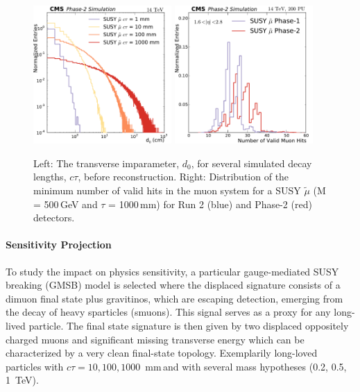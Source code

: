 \begin{figure}[hbtp]\begin{center}
\includegraphics[width=0.47\textwidth]{figures/Stage0h1_0_d0_smuon_daughter}
\includegraphics[width=0.47\textwidth]{figures/MuonHitsEndcap}
\caption{
Left: The transverse imparameter, $d_{0}$, for several simulated decay lengths, $c\tau$, before reconstruction.
Right: Distribution of the minimum number of valid hits in the muon system for a SUSY $\widetilde{\mu}$ (M = 500\,GeV and $\tau$ = 1000\,mm) for Run 2 (blue) and Phase-2 (red) detectors. 
}
\label{fig:perfDisplaced}
\end{center}
\end{figure}

\paragraph{Sensitivity Projection}

To study the impact on physics sensitivity, a particular gauge-mediated SUSY breaking (GMSB) model is selected where
the displaced signature consists of a dimuon final state plus gravitinos, which are escaping detection, emerging from the decay of heavy sparticles (smuons).
This signal serves as a proxy for any long-lived particle.
The final state signature is then given by two displaced oppositely charged muons 
and significant missing transverse energy which can be characterized by a very clean final-state topology.
Exemplarily long-loved particles with $c\tau=10, 100, 1000$~mm\,and with several mass hypotheses (0.2, 0.5, 1~TeV).

